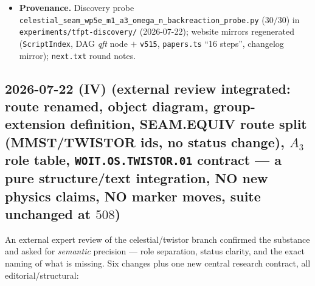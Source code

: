 \documentclass[11pt]{article}
\begin{document}
\begin{itemize}[leftmargin=1.5em]
forcing $N\in4\Z$; source curve $K_4$; conifold nodes; KILL probe $+$ EH/$\operatorname{diag}(i,i)$
controls) added to \texttt{tfpt\_readouts\_extension.wl} and verified with the active engine,
$490\to498$; \texttt{GATE.WOLFRAM.02}, Wolfram README and the website counters synced
($116/116+498/498$).
\item \textbf{Provenance.} Discovery probe
\texttt{celestial\_seam\_}\allowbreak\texttt{wp5e\_m1\_}\allowbreak\texttt{a3\_omega\_n\_}\allowbreak\texttt{backreaction\_probe.py}
($30/30$) in \texttt{experiments/tfpt-discovery/} (2026-07-22); website mirrors regenerated
(\texttt{ScriptIndex}, DAG \emph{qft} node $+$ \texttt{v515}, \texttt{papers.ts} ``16 steps'',
changelog mirror); \texttt{next.txt} round notes.
\end{itemize}

\subsection*{2026-07-22 (IV) (external review integrated: route renamed, object diagram, group-extension definition, SEAM.EQUIV route split (MMST/TWISTOR ids, no status change), $A_3$ role table, \texttt{WOIT.OS.TWISTOR.01} contract --- a pure structure/text integration, NO new physics claims, NO marker moves, suite unchanged at $508$)}
An external expert review of the celestial/twistor branch confirmed the substance and asked for
\emph{semantic} precision --- role separation, status clarity, and the exact naming of what is
missing. Six changes plus one new central research contract, all editorial/structural:
\end{document}
